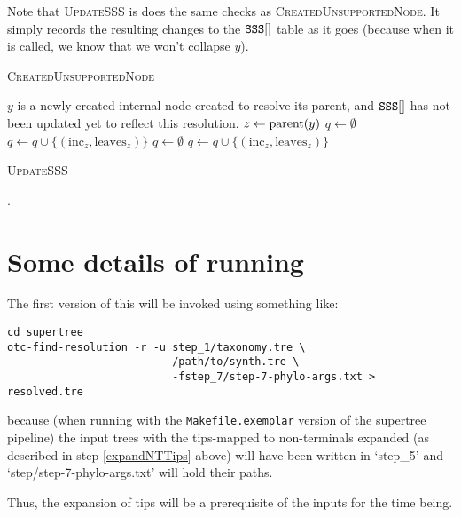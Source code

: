 \documentclass[11pt]{article}
\begin{document}
Note that \textsc{UpdateSSS} is does the same checks as \textsc{CreatedUnsupportedNode}.
It simply records the resulting changes to the $\mbox{\texttt{SSS}}[]$ table as it 
goes (because when it is called, we know that we won't collapse $y$).

\begin{algorithm} \caption{\textsc{CreatedUnsupportedNode}}\label{AlgCreatedUnsupportedNode}
\begin{algorithmic}
\REQUIRE $y$ is a newly created internal node created to resolve its parent, and $\mbox{\texttt{SSS}}[]$ has not been updated yet to reflect this resolution.
\STATE $z \leftarrow \mbox{parent}(y)$
\STATE $q \leftarrow \emptyset$
        \STATE $q\leftarrow q \cup \{(\mbox{inc}_z, \mbox{leaves}_z)\}$
    \ENDIF
\ENDFOR
{}
    \RETURN \TRUE
\ELSE
\ENDIF
{}
    \STATE $q \leftarrow \emptyset$
            \STATE $q\leftarrow q \cup \{(\mbox{inc}_z, \mbox{leaves}_z)\}$
        \ENDIF
    \ENDFOR
        \RETURN \TRUE
    \ELSE
    \ENDIF
\ENDFOR
\RETURN \FALSE
\end{algorithmic}
\end{algorithm}
\begin{algorithm} \caption{\textsc{UpdateSSS}}\label{AlgUpdateSSS}
\begin{algorithmic}
.
\end{algorithmic}
\end{algorithm}

\section*{Some details of running}
The first version of this will be invoked using something like:

\begin{verbatim}
cd supertree
otc-find-resolution -r -u step_1/taxonomy.tre \
                          /path/to/synth.tre \
                          -fstep_7/step-7-phylo-args.txt > resolved.tre
\end{verbatim}
because (when running with the \texttt{Makefile.exemplar} version of the supertree pipeline)
the input trees with the tips-mapped to non-terminals expanded (as described in step \ref{expandNTTips} above) will have been written in `step\_5' and `step/step-7-phylo-args.txt'
will hold their paths.

Thus, the expansion of tips will be a prerequisite of the inputs for the time being.
\end{document}
